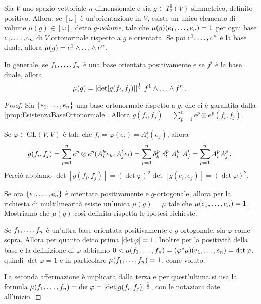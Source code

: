 \begin{proposition} 
	Sia $V$ uno spazio vettoriale $n$ dimensionale e sia $g\in T^0_2(V)$ simmetrico, definito positivo. Allora, se $[\omega]$ è un'orientazione in $V$, esiste un unico elemento di volume $\mu(g) \in [\omega]$, detto \emph{$g$-volume}, tale che $\mu(g)(\seqb en,) = 1$ per ogni base $\seqb en,$ di $V$ ortonormale rispetto a $g$ e orientata.
	Se poi $\seqa en,$ è la base duale, allora $\mu(g) = \seqa en\wedge$.
	
	In generale, se $\seqb fn,$ è una base orientata positivamente e se $f^i$ è la base duale, allora
	\begin{equation*}
		\mu(g) = \abs{ \det[g(f_i,f_j)] }^{\frac 12}\ \seqa fn\wedge \punto
	\end{equation*}
\end{proposition}
\begin{proof}
	Sia $\{\seqb en,\}$ una base ortonormale rispetto a $g$, che ci è garantita dalla \cref{prop:EsistenzaBaseOrtonormale}. Allora $g(f_i,f_j) = \sum_{p=1}^n e^p\otimes e^p (f_i,f_j)$.
	
	Se $\varphi \in \mathrm{GL}(V,V)$ è tale che $f_i = \varphi(e_i) = A_i^j(e_j)$, allora
	\begin{equation*}
	g(f_i,f_j) = \sum_{p=1}^n e^p\otimes e^p (A_i^k e_k, A_j^le_l) = \sum_{p=1}^n \delta_k^p\ \delta_l^p\ A_i^k\ A_j^l = \sum_{p=1}^nA_i^pA_j^p \punto
	\end{equation*}
	Perciò abbiamo $\det[g(f_i,f_j)] = (\det\varphi)^2\det[g(e_i,e_j)] = (\det\varphi)^2$.
	
	Se ora $\{\seqb en,\}$ è orientata positivamente e $g$-ortogonale, allora per la richiesta di multilinearità esiste un'unica $\mu(g)=\mu$ tale che $\mu(\seqb en,) = 1$. Mostriamo che $\mu(g)$ così definita rispetta le ipotesi richieste.
	
	Se $\seqb fn,$ è un'altra base orientata positivamente e $g$-ortogonale, sia $\varphi$ come sopra. Allora per quanto detto prima $\abs{\det\varphi} = 1$. Inoltre per la positività della base e la definizione di $\varphi$ abbiamo $0<\mu(\seqb fn,) = (\varphi^*\mu)(\seqb en,) = \det\varphi$, quindi $\det\varphi=1$ e in particolare $\mu(\seqb fn,)=1$, come voluto.
	
	La seconda affermazione è implicata dalla terza e per quest'ultima si usa la formula $\mu(\seqb fn,) = \det\varphi = \abs{ \det[g(f_i,f_j)] }^\frac 12$, con le notazioni date all'inizio.
\end{proof}
